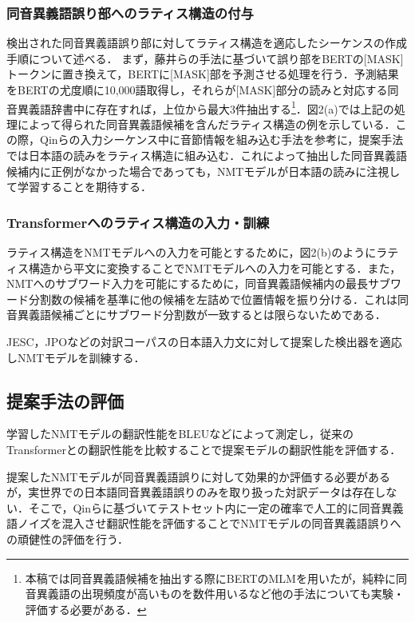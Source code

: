 \documentclass[a4j,10.5pt, twocolumn]{jarticle}
\begin{document}
\subsubsection{同音異義語誤り部へのラティス構造の付与}
検出された同音異義語誤り部に対してラティス構造を適応したシーケンスの作成手順について述べる．
まず，藤井ら\cite{Fujii}の手法に基づいて誤り部をBERTの[MASK]トークンに置き換えて，BERTに[MASK]部を予測させる処理を行う．予測結果をBERTの尤度順に10,000語取得し，それらが[MASK]部分の読みと対応する同音異義語辞書中に存在すれば，上位から最大3件抽出する\footnote{本稿では同音異義語候補を抽出する際にBERTのMLMを用いたが，純粋に同音異義語の出現頻度が高いものを数件用いるなど他の手法についても実験・評価する必要がある．}．図2(a)では上記の処理によって得られた同音異義語候補を含んだラティス構造の例を示している．この際，Qinら\cite{Qin}の入力シーケンス中に音節情報を組み込む手法を参考に，提案手法では日本語の読みをラティス構造に組み込む．これによって抽出した同音異義語候補内に正例がなかった場合であっても，NMTモデルが日本語の読みに注視して学習することを期待する．

\subsubsection{Transformerへのラティス構造の入力・訓練}
ラティス構造をNMTモデルへの入力を可能とするために，図2(b)のようにラティス構造から平文に変換することでNMTモデルへの入力を可能とする．また，NMTへのサブワード入力を可能にするために，同音異義語候補内の最長サブワード分割数の候補を基準に他の候補を左詰めで位置情報を振り分ける．これは同音異義語候補ごとにサブワード分割数が一致するとは限らないためである．

JESC，JPOなどの対訳コーパスの日本語入力文に対して提案した検出器を適応しNMTモデルを訓練する．

\subsection{提案手法の評価}
学習したNMTモデルの翻訳性能をBLEUなどによって測定し，従来のTransformerとの翻訳性能を比較することで提案モデルの翻訳性能を評価する．

提案したNMTモデルが同音異義語誤りに対して効果的か評価する必要があるが，実世界での日本語同音異義語誤りのみを取り扱った対訳データは存在しない．そこで，Qinら\cite{Qin}に基づいてテストセット内に一定の確率で人工的に同音異義語ノイズを混入させ翻訳性能を評価することでNMTモデルの同音異義語誤りへの頑健性の評価を行う．
\end{document}
